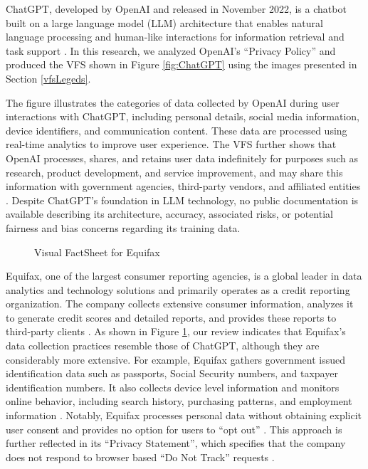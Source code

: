 \documentclass[manuscript,review,anonymous]{acmart}
\begin{document}
	ChatGPT, developed by OpenAI and released in November 2022, is a chatbot built on a large language model (LLM) architecture that enables natural language processing and human-like interactions for information retrieval and task support \cite{ortiz_what_nodate}. In this research, we analyzed OpenAI's \enquote{Privacy Policy} and produced the VFS shown in Figure \ref{fig:ChatGPT} using the images presented in Section \ref{vfsLegeds}.

	The figure illustrates the categories of data collected by OpenAI during user interactions with ChatGPT, including personal details, social media information, device identifiers, and communication content. These data are processed using real-time analytics to improve user experience. The VFS further shows that OpenAI processes, shares, and retains user data indefinitely for purposes such as research, product development, and service improvement, and may share this information with government agencies, third-party vendors, and affiliated entities \cite{openai_privacy_2023}. Despite ChatGPT’s foundation in LLM technology, no public documentation is available describing its architecture, accuracy, associated risks, or potential fairness and bias concerns regarding its training data.

\begin{figure}[!t]
	\begin{minipage}{0.48\textwidth}
		\centering
		\scalebox{0.6}{}
		\caption{Visual FactSheet for ChatGPT }
		\label{fig:ChatGPT}
	\end{minipage}
	\hfill %
	\begin{minipage}{0.48\textwidth}
		\centering
		\scalebox{0.6}{}
		\caption{Visual FactSheet for Equifax }
		\label{fig:Equifax}
	\end{minipage}
\end{figure}

	Equifax, one of the largest consumer reporting agencies, is a global leader in data analytics and technology solutions and primarily operates as a credit reporting organization. The company collects extensive consumer information, analyzes it to generate credit scores and detailed reports, and provides these reports to third-party clients \cite{house_Representatives}. As shown in Figure \ref{fig:Equifax}, our review indicates that Equifax’s data collection practices resemble those of ChatGPT, although they are considerably more extensive. For example, Equifax gathers government issued identification data such as passports, Social Security numbers, and taxpayer identification numbers. It also collects device level information and monitors online behavior, including search history, purchasing patterns, and employment information \cite{equifax}. Notably, Equifax processes personal data without obtaining explicit user consent and provides no option for users to \enquote{opt out} \cite{house_Representatives}. This approach is further reflected in its \enquote{Privacy Statement}, which specifies that the company does not respond to browser based \enquote{Do Not Track} requests \cite{equifax}.
\end{document}
